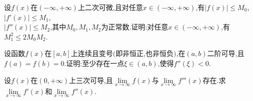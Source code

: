 \begin{example}
	设$f\left( x\right) $在$\left( -\infty ,+\infty \right) $上二次可微,且对任意$x\in \left( -\infty ,+\infty \right) $,有$\left| f\left( x \right) \right|\le M_0$,$\left| f'\left( x \right) \right|\le M_1$,\\$\left| f''\left( x \right) \right|\le M_2$,其中$M_0,M_1,M_2 $为正常数.证明:对任意$x\in \left( -\infty ,+\infty \right) $,有$M_{1}^{2}\le 2M_0M_2$.
\end{example}

\vspace{7cm}

\begin{example}
	设函数$f\left( x\right) $在$\left[ a,b \right] $上连续且变号$($即非恒正,也非恒负$)$,在$\left( a,b\right) $二阶可导,且$f\left( a\right) =f\left( b\right) =0$.证明:至少存在一点$\xi \in \left( a,b \right) $,使得$f''\left( \xi \right) <0$.
\end{example}

\vspace{7cm}

\begin{example}
	设$f\left( x\right) $在$\left( 0 ,+\infty \right) $上三次可导,且$\lim\limits_{x\rightarrow \infty}f\left( x\right) $与$\lim\limits_{x\rightarrow \infty}f'''\left( x\right) $存在.求$\lim\limits_{x\rightarrow \infty}f'\left( x\right) $和$\lim\limits_{x\rightarrow \infty}f''\left( x\right) $.
\end{example}
